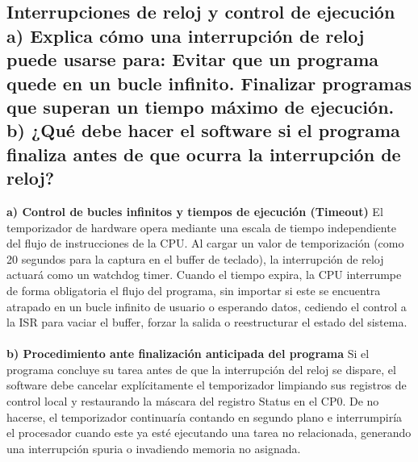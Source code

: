 \documentclass[12pt, a4paper]{article}
\begin{document}
\subsection{Interrupciones de reloj y control de ejecución a) Explica cómo una interrupción de reloj puede usarse para: Evitar que un programa quede en un bucle infinito. Finalizar programas que superan un tiempo máximo de ejecución. b) ¿Qué debe hacer el software si el programa finaliza antes de que ocurra la interrupción de reloj?}
    \textbf{a) Control de bucles infinitos y tiempos de ejecución (Timeout)}
    El temporizador de hardware opera mediante una escala de tiempo independiente del flujo de instrucciones de la CPU. Al cargar un valor de temporización (como 20 segundos para la captura en el buffer de teclado), la interrupción de reloj actuará como un watchdog timer. Cuando el tiempo expira, la CPU interrumpe de forma obligatoria el flujo del programa, sin importar si este se encuentra atrapado en un bucle infinito de usuario o esperando datos, cediendo el control a la ISR para vaciar el buffer, forzar la salida o reestructurar el estado del sistema.\\\\
    \textbf{b) Procedimiento ante finalización anticipada del programa}
    Si el programa concluye su tarea antes de que la interrupción del reloj se dispare, el software debe cancelar explícitamente el temporizador limpiando sus registros de control local y restaurando la máscara del registro Status en el CP0. De no hacerse, el temporizador continuaría contando en segundo plano e interrumpiría el procesador cuando este ya esté ejecutando una tarea no relacionada, generando una interrupción spuria o invadiendo memoria no asignada.
\end{document}
